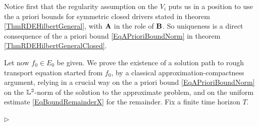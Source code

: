 \documentclass[11pt,a4paper]{amsart}
\newcommand{\ssk}{\smallskip}
\numberwithin{equation}{section} %
\newenvironment{Dem}{%
    \begin{list}{\hspace{0.5cm}{\sc Proof --}}{%
        \setlength{\topsep}{0pt}%
        \setlength{\leftmargin}{0pt}%
        \setlength{\rightmargin}{0pt}%
        \setlength{\listparindent}{0pt}%
        \setlength{\itemindent}{0pt}%
        \setlength{\parsep}{0pt}%
        \addtolength{\leftmargin}{20pt}%
        \addtolength{\rightmargin}{0pt}%
    } \item }{\hfill{\space $\rhd$}\end{list}\smallskip}
\begin{document}
\ssk

\begin{Dem}
Notice first that the regularity assumption on the $V_i$ puts us in a position to use the a priori bounds for symmetric closed drivers stated in theorem \ref{ThmRDEHilbertGeneral}, with $\bf A$ in the role of $\bf B$. So uniqueness is a direct consequence of the a priori bound \eqref{EqAPrioriBoundNorm} in theorem \ref{ThmRDEHilbertGeneralClosed}.

\ssk

Let now $f_0\in E_0$ be given. We prove the existence of a solution path to rough transport equation started from $f_0$, by a classical approximation-compactness argument, relying in a crucial way on the a priori bound \eqref{EqAPrioriBoundNorm} on the $\mathbb{L}^2$-norm of the solution to the approximate problem, and on the uniform estimate \eqref{EqBoundRemainderX} for the remainder. Fix a finite time horizon $T$.

\ssk


\end{Dem}
\end{document}
